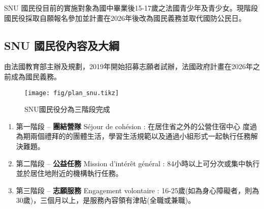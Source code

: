 \documentclass[a4paper,14pt]{extarticle}
\theoremstyle{plain}
\theoremstyle{remark}
\numberwithin{equation}{section}
\begin{document}
SNU 國民役目前的實施對象為國中畢業後15-17歲之法國青少年及青少女。現階段國民役採取自願報名參加並計畫在2026年後改為國民義務並取代國防公民日。


\subsection{SNU 國民役內容及大綱}

由法國教育部主辦及規劃，2019年開始招募志願者試辦，法國政府計畫在2026年之前成為國民義務。

\begin{figure}[H]
  \centering
  \texttt{[image: fig/plan\_snu.tikz]}
  \caption{SNU國民役分為三階段完成}
  \label{fig:plan_snu}
\end{figure}

\begin{enumerate}
  \item 第一階段 -- \textbf{團結營隊} Séjour de cohésion : 
		在居住省之外的公營住宿中心 度過為期兩個禮拜的的團體生活，學習生活規範以及通過小組形式一起執行任務解決難題。
  \item 第二階段 -- \textbf{公益任務} Mission d'intérêt général :
		84小時以上可分次或集中執行並於居住地附近的機構執行任務。
  \item 第三階段 -- \textbf{志願服務} Engagement volontaire : 16-25歲(如為身心障礙者，則為30歲)，三個月以上，是服務內容領有津貼(全職或兼職)。 
\end{enumerate}
\end{document}
